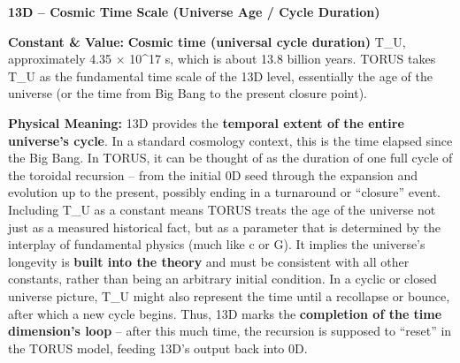 \documentclass[]{article}
\begin{document}
\textbf{13D -- Cosmic Time Scale (Universe Age / Cycle Duration)}

\textbf{Constant \& Value:} \textbf{Cosmic time (universal cycle
duration)} T\_U, approximately 4.35 × 10\^{}17 s​, which is about 13.8
billion years. TORUS takes T\_U as the fundamental time scale of the 13D
level, essentially the age of the universe (or the time from Big Bang to
the present closure point).

\textbf{Physical Meaning:} 13D provides the \textbf{temporal extent of
the entire universe's cycle}. In a standard cosmology context, this is
the time elapsed since the Big Bang. In TORUS, it can be thought of as
the duration of one full cycle of the toroidal recursion -- from the
initial 0D seed through the expansion and evolution up to the present,
possibly ending in a turnaround or ``closure'' event​. Including T\_U as
a constant means TORUS treats the age of the universe not just as a
measured historical fact, but as a parameter that is determined by the
interplay of fundamental physics (much like c or G). It implies the
universe's longevity is \textbf{built into the theory} and must be
consistent with all other constants, rather than being an arbitrary
initial condition​. In a cyclic or closed universe picture, T\_U might
also represent the time until a recollapse or bounce, after which a new
cycle begins. Thus, 13D marks the \textbf{completion of the time
dimension's loop} -- after this much time, the recursion is supposed to
``reset'' in the TORUS model, feeding 13D's output back into 0D.
\end{document}
